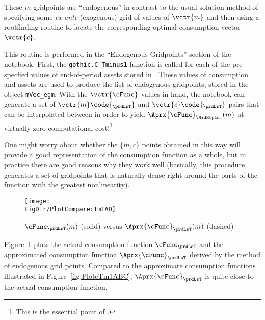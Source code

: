 \documentclass[titlepage, headings=optiontotocandhead]{Resources/texmf-local/tex/latex/econtex}
\begin{document}

These $m$ gridpoints are ``endogenous'' in contrast to the usual solution method of specifying some \textit{ex-ante} (exogenous) grid of values of $\vctr{m}$ and then using a rootfinding routine to locate the corresponding optimal consumption vector $\vctr{c}$.


This routine is performed in the ``Endogenous Gridpoints'' section of the notebook. First, the \texttt{gothic.C\_Tminus1} function is called for each of the pre-specfied values of end-of-period assets stored in . These values of consumption and assets are used to produce the list of endogenous gridpoints, stored in the object \texttt{mVec\_egm}. With the $\vctr{\cFunc}$ values in hand, the notebook can generate a set of $\vctr{m}\code{_{\prdLsT}}$ and ${\vctr{c}\code{_{\prdLsT}}}$ pairs that can be interpolated between in order to yield $\Aprx{\cFunc}_{\MidStpLsT}(m)$ at virtually zero computational cost!\footnote{This is the essential point of \cite{carrollEGM}.} %

\hypertarget{PlotComparecTm1AD}{}
One might worry about whether the $\{{m},c\}$ points obtained in this way will provide a good representation of the consumption function as a whole, but in practice there are good reasons why they work well (basically, this procedure generates a set of gridpoints that is naturally dense right around the parts of the function with the greatest nonlinearity).
\begin{figure}
  \centerline{\texttt{[image: \\FigDir/PlotComparecTm1AD]}}
  \caption{$\cFunc_{\prdLsT}(m)$ (solid) versus $\Aprx{\cFunc}_{\prdLsT}(m)$ (dashed)}
  \label{fig:ComparecTm1AD}
\end{figure}
Figure~\ref{fig:ComparecTm1AD} plots the actual consumption function $\cFunc_{\prdLsT}$ and the approximated consumption function $\Aprx{\cFunc}_{\prdLsT}$ derived by the method of endogenous grid points. Compared to the approximate consumption functions illustrated in Figure~\ref{fig:PlotcTm1ABC}, $\Aprx{\cFunc}_{\prdLsT}$ is quite close to the actual consumption function.
\end{document}

